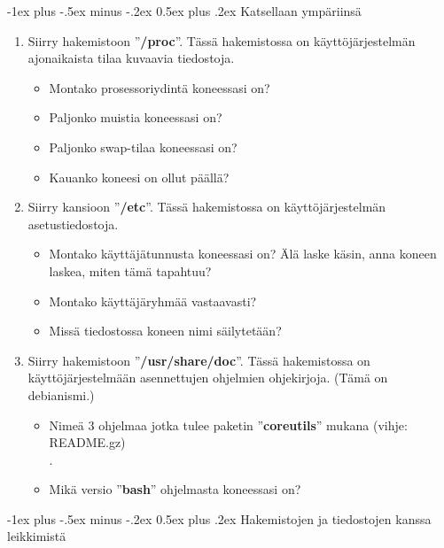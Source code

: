 \documentclass[12pt,portrait,a4]{article}
\makeatletter
\renewcommand{\section}{\@startsection{section}{1}{0mm}%
                                {-1ex plus -.5ex minus -.2ex}%
                                {0.5ex plus .2ex}%
                                {\normalfont\large\bfseries}}
\makeatother
\begin{document}
\section{Katsellaan ympäriinsä}

\begin{enumerate}
\item Siirry hakemistoon ''\textbf{/proc}''.  Tässä hakemistossa on käyttöjärjestelmän
ajonaikaista tilaa kuvaavia tiedostoja.
	\begin{itemize}
	\item Montako prosessoriydintä koneessasi on? \hrulefill
	\item Paljonko muistia koneessasi on? \hrulefill
	\item Paljonko swap-tilaa koneessasi on? \hrulefill
	\item Kauanko koneesi on ollut päällä? \hrulefill
	\end{itemize}

\item Siirry kansioon ''\textbf{/etc}''.  Tässä hakemistossa on käyttöjärjestelmän
asetustiedostoja.
	\begin{itemize}
	\item Montako käyttäjätunnusta koneessasi on?  Älä laske käsin, anna
koneen laskea, miten tämä tapahtuu? \hrulefill
	\item Montako käyttäjäryhmää vastaavasti? \hrulefill
	\item Missä tiedostossa koneen nimi säilytetään? \hrulefill
	\end{itemize}

\item Siirry hakemistoon ''\textbf{/usr/share/doc}''.  Tässä hakemistossa on
käyttöjärjestelmään asennettujen ohjelmien ohjekirjoja.  (Tämä on debianismi.)
	\begin{itemize}
	\item Nimeä 3 ohjelmaa jotka tulee paketin ''\textbf{coreutils}'' mukana (vihje: README.gz)
\\ . \hrulefill
	\item Mikä versio ''\textbf{bash}'' ohjelmasta koneessasi on?
\hrulefill
	\end{itemize}
\end{enumerate}

\section{Hakemistojen ja tiedostojen kanssa leikkimistä}
\end{document}

